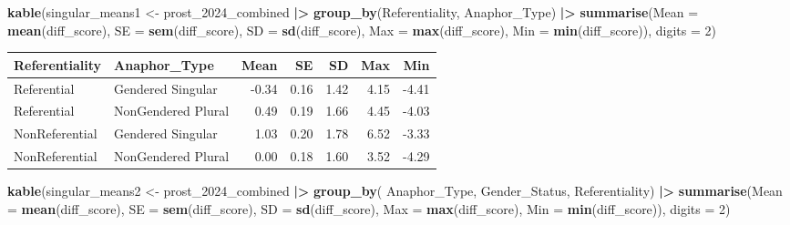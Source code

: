 \documentclass[
  10pt,
]{article}
\newenvironment{Shaded}{\begin{snugshade}}{\end{snugshade}}
\newcommand{\AttributeTok}[1]{\textcolor[rgb]{0.13,0.29,0.53}{#1}}
\newcommand{\DecValTok}[1]{\textcolor[rgb]{0.00,0.00,0.81}{#1}}
\newcommand{\FunctionTok}[1]{\textcolor[rgb]{0.13,0.29,0.53}{\textbf{#1}}}
\newcommand{\NormalTok}[1]{#1}
\newcommand{\OtherTok}[1]{\textcolor[rgb]{0.56,0.35,0.01}{#1}}
\newcommand{\SpecialCharTok}[1]{\textcolor[rgb]{0.81,0.36,0.00}{\textbf{#1}}}
\begin{document}
\begin{Shaded}
\begin{Highlighting}[]
\FunctionTok{kable}\NormalTok{(singular\_means1 }\OtherTok{\textless{}{-}}\NormalTok{ prost\_2024\_combined }\SpecialCharTok{|\textgreater{}} 
  \FunctionTok{group\_by}\NormalTok{(Referentiality, Anaphor\_Type) }\SpecialCharTok{|\textgreater{}}
  \FunctionTok{summarise}\NormalTok{(}\AttributeTok{Mean =} \FunctionTok{mean}\NormalTok{(diff\_score), }
            \AttributeTok{SE =} \FunctionTok{sem}\NormalTok{(diff\_score), }
            \AttributeTok{SD =} \FunctionTok{sd}\NormalTok{(diff\_score), }
            \AttributeTok{Max =} \FunctionTok{max}\NormalTok{(diff\_score), }
            \AttributeTok{Min =} \FunctionTok{min}\NormalTok{(diff\_score)), }\AttributeTok{digits =} \DecValTok{2}\NormalTok{)}
\end{Highlighting}
\end{Shaded}

\begin{longtable}[]{@{}llrrrrr@{}}
\toprule\noalign{}
Referentiality & Anaphor\_Type & Mean & SE & SD & Max & Min \\
\midrule\noalign{}
\endhead
\bottomrule\noalign{}
\endlastfoot
Referential & Gendered Singular & -0.34 & 0.16 & 1.42 & 4.15 & -4.41 \\
Referential & NonGendered Plural & 0.49 & 0.19 & 1.66 & 4.45 & -4.03 \\
NonReferential & Gendered Singular & 1.03 & 0.20 & 1.78 & 6.52 &
-3.33 \\
NonReferential & NonGendered Plural & 0.00 & 0.18 & 1.60 & 3.52 &
-4.29 \\
\end{longtable}

\begin{Shaded}
\begin{Highlighting}[]
\FunctionTok{kable}\NormalTok{(singular\_means2 }\OtherTok{\textless{}{-}}\NormalTok{ prost\_2024\_combined }\SpecialCharTok{|\textgreater{}} 
  \FunctionTok{group\_by}\NormalTok{( Anaphor\_Type, Gender\_Status,  Referentiality) }\SpecialCharTok{|\textgreater{}}
  \FunctionTok{summarise}\NormalTok{(}\AttributeTok{Mean =} \FunctionTok{mean}\NormalTok{(diff\_score), }
            \AttributeTok{SE =} \FunctionTok{sem}\NormalTok{(diff\_score), }
            \AttributeTok{SD =} \FunctionTok{sd}\NormalTok{(diff\_score), }
            \AttributeTok{Max =} \FunctionTok{max}\NormalTok{(diff\_score), }
            \AttributeTok{Min =} \FunctionTok{min}\NormalTok{(diff\_score)), }\AttributeTok{digits =} \DecValTok{2}\NormalTok{)}
\end{Highlighting}
\end{Shaded}
\end{document}
